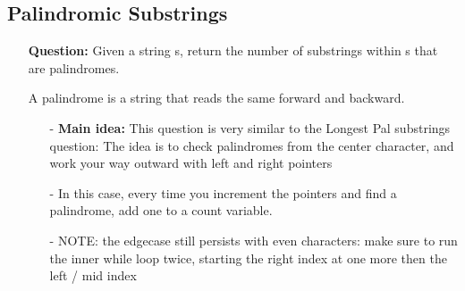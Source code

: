 \documentclass[12pt]{article}
\begin{document}
\subsection{Palindromic Substrings}
\begin{enumerate}
  \item[] \textbf{Question:} Given a string s, return the number of substrings within s that are palindromes.

A palindrome is a string that reads the same forward and backward.

    \begin{enumerate}
      \item[-] \textbf{Main idea:} This question is very similar to the Longest Pal substrings question: The idea is to check palindromes from the center character, and work your way outward with left and right pointers
      \item[-] In this case, every time you increment the pointers and find a palindrome, add one to a count variable. 
      \item[-] NOTE: the edgecase still persists with even characters: make sure to run the inner while loop twice, starting the right index at one more then the left / mid index
    \end{enumerate}
\end{enumerate}
\end{document}
